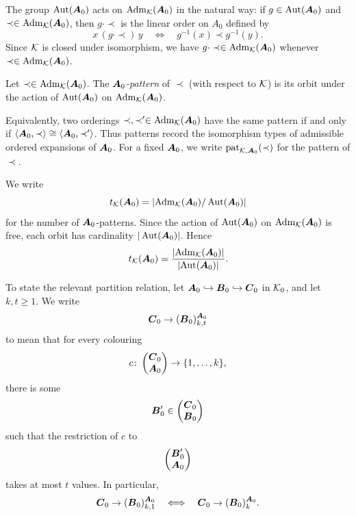 The group \(\operatorname{Aut}(\boldsymbol{A}_0)\) acts on \(\operatorname{Adm}_{\mathcal{K}}(\boldsymbol{A}_0)\) in the natural way: if \(g\in\operatorname{Aut}(\boldsymbol{A}_0)\) and \(\prec\in\operatorname{Adm}_{\mathcal{K}}(\boldsymbol{A}_0)\), then \(g\cdot\prec\) is the linear order on \(A_0\) defined by
\[
    x\,(g\cdot\prec)\,y
    \quad\Longleftrightarrow\quad
    g^{-1}(x)\prec g^{-1}(y).
\]
Since \(\mathcal{K}\) is closed under isomorphism, we have \(g\cdot\prec\in\operatorname{Adm}_{\mathcal{K}}(\boldsymbol{A}_0)\) whenever \(\prec\in\operatorname{Adm}_{\mathcal{K}}(\boldsymbol{A}_0)\).

\begin{definition}
    Let \(\prec\in\operatorname{Adm}_{\mathcal{K}}(\boldsymbol{A}_0)\). The \emph{\(\boldsymbol{A}_0\)-pattern} of \(\prec\) (with respect to \(\mathcal{K}\)) is its orbit under the action of \(\operatorname{Aut}(\boldsymbol{A}_0)\) on \(\operatorname{Adm}_{\mathcal{K}}(\boldsymbol{A}_0)\).
\end{definition}

Equivalently, two orderings \(\prec,\prec'\in\operatorname{Adm}_{\mathcal{K}}(\boldsymbol{A}_0)\) have the same pattern if and only if \(\langle \boldsymbol{A}_0,\prec\rangle \cong \langle \boldsymbol{A}_0,\prec'\rangle\).
Thus patterns record the isomorphism types of admissible ordered expansions of \(\boldsymbol{A}_0\).
For a fixed \(\boldsymbol{A}_0\), we write
\(\operatorname{pat}_{\mathcal{K},\boldsymbol{A}_0}(\prec)\) for the pattern of \(\prec\).

We write
\[
    t_{\mathcal{K}}(\boldsymbol{A}_0)
    =
    \left|\operatorname{Adm}_{\mathcal{K}}(\boldsymbol{A}_0)/\operatorname{Aut}(\boldsymbol{A}_0)\right|
\]
for the number of \(\boldsymbol{A}_0\)-patterns. Since the action of \(\operatorname{Aut}(\boldsymbol{A}_0)\) on \(\operatorname{Adm}_{\mathcal{K}}(\boldsymbol{A}_0)\) is free, each orbit has cardinality \(|\operatorname{Aut}(\boldsymbol{A}_0)|\). Hence
\[
    t_{\mathcal{K}}(\boldsymbol{A}_0)
    =
    \frac{\left|\operatorname{Adm}_{\mathcal{K}}(\boldsymbol{A}_0)\right|}{\left|\operatorname{Aut}(\boldsymbol{A}_0)\right|}.
\]

To state the relevant partition relation, let
\(\boldsymbol{A}_0\hookrightarrow\boldsymbol{B}_0\hookrightarrow\boldsymbol{C}_0\) in \(\mathcal{K}_0\), and let
\(k,t\geq 1\). We write
\[
    \boldsymbol{C}_0\to(\boldsymbol{B}_0)^{\boldsymbol{A}_0}_{k,t}
\]
to mean that for every colouring
\[
    c\colon\begin{pmatrix}\boldsymbol{C}_0\\ \boldsymbol{A}_0\end{pmatrix}\to\{1,\dots,k\},
\]
there is some
\[
    \boldsymbol{B}_0'\in\begin{pmatrix}\boldsymbol{C}_0\\ \boldsymbol{B}_0\end{pmatrix}
\]
such that the restriction of \(c\) to
\[
    \begin{pmatrix}\boldsymbol{B}_0'\\ \boldsymbol{A}_0\end{pmatrix}
\]
takes at most \(t\) values. In particular,
\[
    \boldsymbol{C}_0\to(\boldsymbol{B}_0)^{\boldsymbol{A}_0}_{k,1}
    \quad\Longleftrightarrow\quad
    \boldsymbol{C}_0\to(\boldsymbol{B}_0)^{\boldsymbol{A}_0}_{k}.
\]

